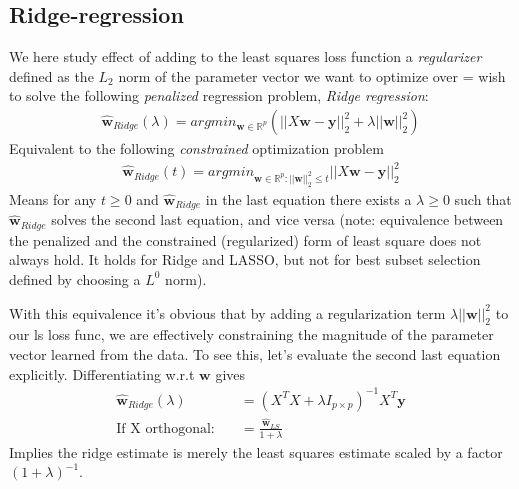 \documentclass[norsk,a4paper,11pt]{article}
\begin{document}
\subsection{Ridge-regression}
We here study effect of adding to the least squares loss function a \textit{regularizer} defined as the $L_2$ norm of the parameter vector we want to optimize over = wish to solve the following \textit{penalized} regression problem, \textit{Ridge regression}:
\begin{align}
	\hat{\mathbf{w}}_{Ridge} (\lambda) = argmin_{\mathbf{w} \in \mathbb{R}^p}  (||X \mathbf{w} - \mathbf{y}||_2^2 + \lambda ||\mathbf{w}||_2^2)
\end{align}
Equivalent to the following \textit{constrained} optimization problem
\begin{align}
	\hat{\mathbf{w}}_{Ridge} (t) = argmin_{\mathbf{w} \in \mathbb{R}^p : ||\mathbf{w}||_2^2 \leq t} ||X \mathbf{w} - \mathbf{y}||_2^2 
\end{align}
Means for any $t\geq 0$ and $\hat{\mathbf{w}}_{Ridge}$ in the last equation there exists a $\lambda \geq 0$ such that $\hat{\mathbf{w}}_{Ridge}$ solves the second last equation, and vice versa (note: equivalence between the penalized and the constrained (regularized) form of least square does not always hold. It holds for Ridge and LASSO, but not for best subset selection defined by choosing a $L^0$ norm). 

With this equivalence it's obvious that by adding a regularization term $\lambda ||\mathbf{w}||_2^2$ to our ls loss func, we are effectively constraining the magnitude of the parameter vector learned from the data. To see this, let's evaluate the second last equation explicitly. Differentiating w.r.t $\mathbf{w}$ gives
\begin{align}
	\hat{\mathbf{w}}_{Ridge} (\lambda) &= (X^T X + \lambda I_{p \times p})^{-1} X^T \mathbf{y} \\
	\text{If X orthogonal:} \quad &= \frac{\hat{\mathbf{w}}_{LS}}{1 + \lambda} 
\end{align}
Implies the ridge estimate is merely the least squares estimate scaled by a factor $(1 + \lambda)^{-1}$.
\end{document}

